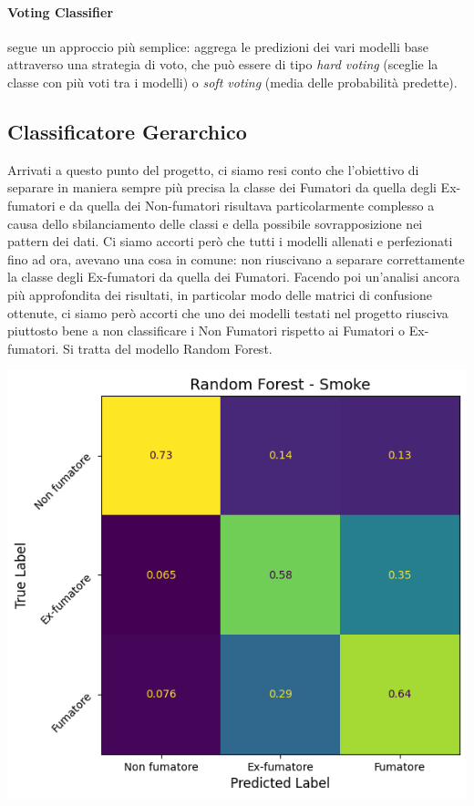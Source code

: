 \documentclass{article}
\begin{document}
\begin{multicols}{2}
\paragraph{Voting Classifier} segue un approccio più semplice: aggrega le predizioni dei vari modelli base attraverso una strategia di voto, che può essere di tipo \emph{hard voting} (sceglie la classe con più voti tra i modelli) o \emph{soft voting} (media delle probabilità predette).

\subsection{Classificatore Gerarchico}

Arrivati a questo punto del progetto, ci siamo resi conto che l'obiettivo di separare in maniera sempre più precisa la classe dei Fumatori da quella degli Ex-fumatori e da quella dei Non-fumatori risultava particolarmente complesso a causa dello sbilanciamento delle classi e della possibile sovrapposizione nei pattern dei dati. 
Ci siamo accorti però che tutti i modelli allenati e perfezionati fino ad ora, avevano una cosa in comune: non riuscivano a separare correttamente la classe degli Ex-fumatori da quella dei Fumatori. 
Facendo poi un'analisi ancora più approfondita dei risultati, in particolar modo delle matrici di confusione ottenute, ci siamo però accorti che uno dei modelli testati nel progetto riusciva piuttosto bene a non classificare i Non Fumatori rispetto ai Fumatori o Ex-fumatori. 
Si tratta del modello Random Forest.

\begin{center}
    \includegraphics[width=0.75\columnwidth]{screen_results/confusion_matrix_rf_optimized_s.png}
\end{center}


\end{multicols}
\end{document}
